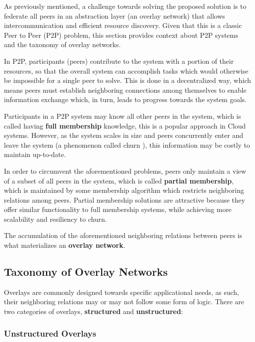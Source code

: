 

As previously mentioned, a challenge towards solving the proposed solution is to federate all peers in an abstraction layer (an overlay network) that allows intercommunication and efficient resource discovery. Given that this is a classic Peer to Peer (P2P) problem, this section provides context about P2P systems and the taxonomy of overlay networks.

In P2P, participants (peers) contribute to the system with a portion of their resources, so that the overall system can accomplish tasks which would otherwise be impossible for a single peer to solve. This is done in a decentralized way, which means peers must establish neighboring connections among themselves to enable information exchange which, in turn, leads to progress towards the system goals. 

Participants in a P2P system may know all other peers in the system, which is called having \textbf{full membership} knowledge, this is a popular approach in Cloud systems. However, as the system scales in size and peers concurrently enter and leave the system (a phenomenon called churn \cite{stutzbach2006understanding}), this information may be costly to maintain up-to-date. 

In order to circumvent the aforementioned problems, peers only maintain a view of a subset of all peers in the system, which is called \textbf{partial membership}, which is maintained by some membership algorithm which restricts neighboring relations among peers. Partial membership solutions are attractive because they offer similar functionality to full membership systems, while achieving more scalability and resiliency to churn. 

The accumulation of the aforementioned neighboring relations between peers is what materializes an \textbf{overlay network}.

\subsection{Taxonomy of Overlay Networks}

Overlays are commonly designed towards specific applicational needs, as such, their neighboring relations may or may not follow some form of logic. There are two categories of overlays, \textbf{structured} and \textbf{unstructured}:

\subsubsection*{Unstructured Overlays}

